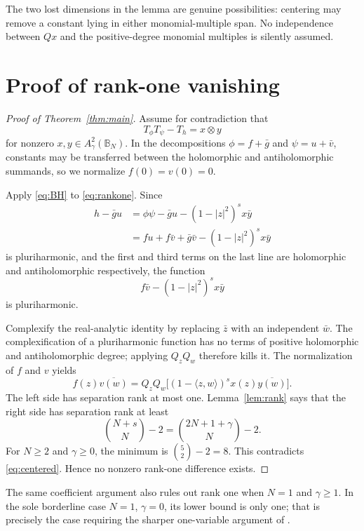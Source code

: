 \documentclass[11pt]{article}
\newcommand{\B}{\mathbb B}
\begin{document}
The two lost dimensions in the lemma are genuine possibilities: centering
may remove a constant lying in either monomial-multiple span.  No
independence between $Qx$ and the positive-degree monomial multiples is
silently assumed.

\section{Proof of rank-one vanishing}

\begin{proof}[Proof of Theorem~\ref{thm:main}]
Assume for contradiction that
\begin{equation}\label{eq:rankone}
 T_\phi T_\psi-T_h=x\otimes y
\end{equation}
for nonzero $x,y\in A^2_\gamma(\B_N)$.  In the decompositions
$\phi=f+\bar g$ and $\psi=u+\bar v$, constants may be transferred between
the holomorphic and antiholomorphic summands, so we normalize
$f(0)=v(0)=0$.

\pagebreak
Apply \eqref{eq:BH} to \eqref{eq:rankone}.  Since
\begin{align*}
 h-\bar g u
 &=\phi\psi-\bar g u-(1-|z|^2)^s x\bar y\\
 &=fu+f\bar v+\bar g\bar v-(1-|z|^2)^s x\bar y
\end{align*}
is pluriharmonic, and the first and third terms on the last line are
holomorphic and antiholomorphic respectively, the function
\[
 f\bar v-(1-|z|^2)^s x\bar y
\]
is pluriharmonic.

Complexify the real-analytic identity by replacing $\bar z$ with an
independent $\bar w$.  The complexification of a pluriharmonic function has
no terms of positive holomorphic and antiholomorphic degree; applying
$Q_zQ_w$ therefore kills it.  The normalization of $f$ and $v$ yields
\begin{equation}\label{eq:centered}
 f(z)\overline{v(w)}
 =Q_zQ_w\bigl[(1-\langle z,w\rangle)^s
                 x(z)\overline{y(w)}\bigr].
\end{equation}
The left side has separation rank at most one.  Lemma~\ref{lem:rank} says
that the right side has separation rank at least
\[
 \binom{N+s}{N}-2
 =\binom{2N+1+\gamma}{N}-2.
\]
For $N\ge2$ and $\gamma\ge0$, the minimum is
$\binom{5}{2}-2=8$.  This contradicts \eqref{eq:centered}.  Hence no
nonzero rank-one difference exists.
\end{proof}

The same coefficient argument also rules out rank one when $N=1$ and
$\gamma\ge1$.  In the sole borderline case $N=1$, $\gamma=0$, its lower
bound is only one; that is precisely the case requiring the sharper
one-variable argument of \cite{DQZ}.
\end{document}
